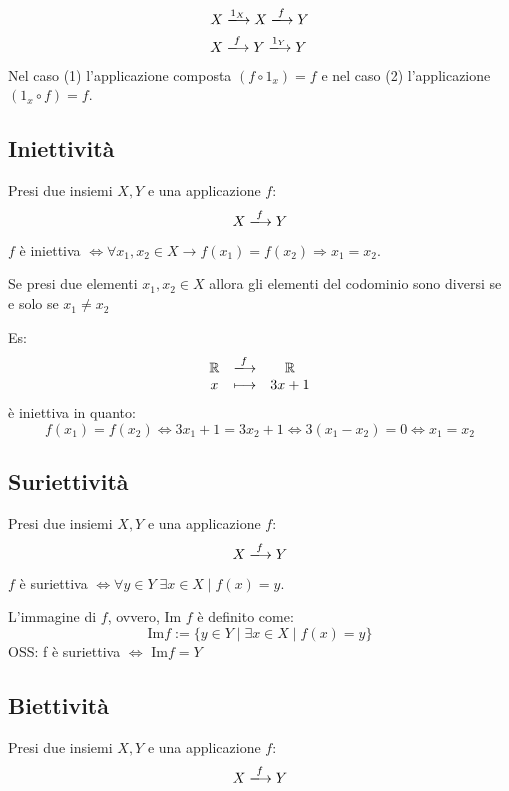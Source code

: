 \documentclass[a4paper,12pt]{article}
\begin{document}
	\setcounter{equation}{0}
	\begin{align}
		X & \xlongrightarrow{1_X} X \xlongrightarrow{f} Y \\
		X & \xlongrightarrow{f} Y \xlongrightarrow{1_Y} Y
	\end{align}
	Nel caso (1) l'applicazione composta $(f \circ 1_x) = f$ e nel caso (2) l'applicazione $(1_x \circ f) = f$.
	
	\subsection{Iniettività}
	Presi due insiemi $X, Y$ e una applicazione $f$:
	\[
	X \xlongrightarrow{f} Y
	\] 
	
	\begin{center}
		$f$ è iniettiva $\iff \forall x_1,x_2 \in X \rightarrow f(x_1) = f(x_2) \Rightarrow x_1 = x_2$.
	\end{center}
	
	Se presi due elementi $x_1, x_2 \in X$ allora gli elementi del codominio sono diversi se e solo se $x_1 \not = x_2$
	
	Es: 
	\[
	\begin{array}{c c c}
		\mathbb{R} & \xlongrightarrow{f} & \mathbb{R} \\
		x & \longmapsto & 3x + 1\\
	\end{array}
	\]
	è iniettiva in quanto:
	\[
	f(x_1) = f(x_2) \iff 3x_1 + 1 = 3x_2 + 1 \iff 3(x_1 - x_2) = 0 \iff x_1 = x_2
	\]
	
	\subsection{Suriettività}
	Presi due insiemi $X, Y$ e una applicazione $f$:
	\[
	X \xlongrightarrow{f} Y
	\] 
	
	\begin{center}
		$f$ è suriettiva $\iff \forall y \in Y \; \exists x\in X \mid f(x) = y$.
	\end{center}
	
	L'immagine di $f$, ovvero, Im $f$ è definito come: 
	\[
	\text{Im} f:= \{y \in Y \mid \exists x\in X \mid f(x) = y\}
	\]
	OSS: f è suriettiva $\iff$ Im$f = Y$
	\subsection{Biettività}
	Presi due insiemi $X, Y$ e una applicazione $f$:
	\[
	X \xlongrightarrow{f} Y
	\] 
	
\end{document}
